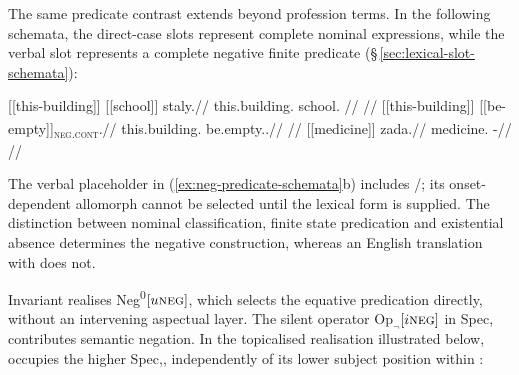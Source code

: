 The same predicate contrast extends beyond profession terms. In the
following schemata, the direct-case slots represent complete nominal
expressions, while the verbal slot represents a complete negative finite
predicate (§\,\ref{sec:lexical-slot-schemata}):

\pex\label{ex:neg-predicate-schemata}
\a
\begingl
\gla \textnormal{[[this-building]]}\textsubscript{\Dir{}} \textnormal{[[school]]}\textsubscript{\Dir{}} staly.//
\glb this.building.\Dir{} school.\Dir{} \Neg{}//
\glft {}
//
\endgl
\a
\begingl
\gla \textnormal{[[this-building]]}\textsubscript{\Dir{}} \textnormal{[[be-empty]]}\textsubscript{\textsc{neg.cont}}.//
\glb this.building.\Dir{} be.empty.\Neg{}.\Cont{}//
\glft {}
//
\endgl
\a
\begingl
\gla \textnormal{[[medicine]]}\textsubscript{\Dir{}} zada.//
\glb medicine.\Dir{} \NegExst{}-\Cont{}//
\glft {}
//
\endgl
\xe

The verbal placeholder in (\ref{ex:neg-predicate-schemata}b) includes
/; its onset-dependent allomorph cannot be selected until
the lexical form is supplied. The distinction between nominal classification,
finite state predication and existential absence determines the negative
construction, whereas an English translation with  does not.

Invariant  realises Neg\textsuperscript{0}$[u\textsc{neg}]$, which selects the
equative predication directly, without an intervening aspectual layer. The
silent operator $\mathrm{Op}_{\neg}$$[i\textsc{neg}]$ in Spec, contributes semantic
negation. In the topicalised realisation illustrated below, 
occupies the higher Spec,, independently of its lower subject
position within :

